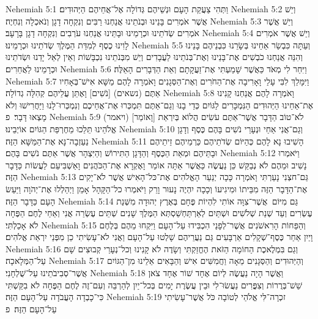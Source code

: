 Nehemiah 5:1	וַתְּהִי צַעֲקַת הָעָם וּנְשֵׁיהֶם גְּדוֹלָה אֶל־אֲחֵיהֶם הַיְּהוּדִים׃
Nehemiah 5:2	וְיֵשׁ אֲשֶׁר אֹמְרִים בָּנֵינוּ וּבְנֹתֵינוּ אֲנַחְנוּ רַבִּים וְנִקְחָה דָגָן וְנֹאכְלָה וְנִחְיֶה׃
Nehemiah 5:3	וְיֵשׁ אֲשֶׁר אֹמְרִים שְׂדֹתֵינוּ וּכְרָמֵינוּ וּבָתֵּינוּ אֲנַחְנוּ עֹרְבִים וְנִקְחָה דָגָן בָּרָעָב׃
Nehemiah 5:4	וְיֵשׁ אֲשֶׁר אֹמְרִים לָוִינוּ כֶסֶף לְמִדַּת הַמֶּלֶךְ שְׂדֹתֵינוּ וּכְרָמֵינוּ׃
Nehemiah 5:5	וְעַתָּה כִּבְשַׂר אַחֵינוּ בְּשָׂרֵנוּ כִּבְנֵיהֶם בָּנֵינוּ וְהִנֵּה אֲנַחְנוּ כֹבְשִׁים אֶת־בָּנֵינוּ וְאֶת־בְּנֹתֵינוּ לַעֲבָדִים וְיֵשׁ מִבְּנֹתֵינוּ נִכְבָּשׁוֹת וְאֵין לְאֵל יָדֵנוּ וּשְׂדֹתֵינוּ וּכְרָמֵינוּ לַאֲחֵרִים׃
Nehemiah 5:6	וַיִּחַר לִי מְאֹד כַּאֲשֶׁר שָׁמַעְתִּי אֶת־זַעֲקָתָם וְאֵת הַדְּבָרִים הָאֵלֶּה׃
Nehemiah 5:7	וַיִּמָּלֵךְ לִבִּי עָלַי וָאָרִיבָה אֶת־הַחֹרִים וְאֶת־הַסְּגָנִים וָאֹמְרָה לָהֶם מַשָּׁא אִישׁ־בְּאָחִיו אַתֶּם (נשאים) [נֹשִׁים] וָאֶתֵּן עֲלֵיהֶם קְהִלָּה גְדוֹלָה׃
Nehemiah 5:8	וָאֹמְרָה לָהֶם אֲנַחְנוּ קָנִינוּ אֶת־אַחֵינוּ הַיְּהוּדִים הַנִּמְכָּרִים לַגּוֹיִם כְּדֵי בָנוּ וְגַם־אַתֶּם תִּמְכְּרוּ אֶת־אֲחֵיכֶם וְנִמְכְּרוּ־לָנוּ וַיַּחֲרִישׁוּ וְלֹא מָצְאוּ דָּבָר׃ {פ}
Nehemiah 5:9	(ויאמר) [וָאוֹמַר] לֹא־טוֹב הַדָּבָר אֲשֶׁר־אַתֶּם עֹשִׂים הֲלוֹא בְּיִרְאַת אֱלֹהֵינוּ תֵּלֵכוּ מֵחֶרְפַּת הַגּוֹיִם אוֹיְבֵינוּ׃
Nehemiah 5:10	וְגַם־אֲנִי אַחַי וּנְעָרַי נֹשִׁים בָּהֶם כֶּסֶף וְדָגָן נַעַזְבָה־נָּא אֶת־הַמַּשָּׁא הַזֶּה׃
Nehemiah 5:11	הָשִׁיבוּ נָא לָהֶם כְּהַיּוֹם שְׂדֹתֵיהֶם כַּרְמֵיהֶם זֵיתֵיהֶם וּבָתֵּיהֶם וּמְאַת הַכֶּסֶף וְהַדָּגָן הַתִּירוֹשׁ וְהַיִּצְהָר אֲשֶׁר אַתֶּם נֹשִׁים בָּהֶם׃
Nehemiah 5:12	וַיֹּאמְרוּ נָשִׁיב וּמֵהֶם לֹא נְבַקֵּשׁ כֵּן נַעֲשֶׂה כַּאֲשֶׁר אַתָּה אוֹמֵר וָאֶקְרָא אֶת־הַכֹּהֲנִים וָאַשְׁבִּיעֵם לַעֲשׂוֹת כַּדָּבָר הַזֶּה׃
Nehemiah 5:13	גַּם־חצְנִי נָעַרְתִּי וָאֹמְרָה כָּכָה יְנַעֵר הָאֱלֹהִים אֶת־כּל־הָאִישׁ אֲשֶׁר לֹא־יָקִים אֶת־הַדָּבָר הַזֶּה מִבֵּיתוֹ וּמִיגִיעוֹ וְכָכָה יִהְיֶה נָעוּר וָרֵק וַיֹּאמְרוּ כל־הַקָּהָל אָמֵן וַיְהַלְלוּ אֶת־יְהֹוָה וַיַּעַשׂ הָעָם כַּדָּבָר הַזֶּה׃
Nehemiah 5:14	גַּם מִיּוֹם  אֲשֶׁר־צִוָּה אוֹתִי לִהְיוֹת פֶּחָם בְּאֶרֶץ יְהוּדָה מִשְּׁנַת עֶשְׂרִים וְעַד שְׁנַת שְׁלֹשִׁים וּשְׁתַּיִם לְאַרְתַּחְשַׁסְתְּא הַמֶּלֶךְ שָׁנִים שְׁתֵּים עֶשְׂרֵה אֲנִי וְאַחַי לֶחֶם הַפֶּחָה לֹא אָכַלְתִּי׃
Nehemiah 5:15	וְהַפַּחוֹת הָרִאשֹׁנִים אֲשֶׁר־לְפָנַי הִכְבִּידוּ עַל־הָעָם וַיִּקְחוּ מֵהֶם בְּלֶחֶם וָיַיִן אַחַר כֶּסֶף־שְׁקָלִים אַרְבָּעִים גַּם נַעֲרֵיהֶם שָׁלְטוּ עַל־הָעָם וַאֲנִי לֹא־עָשִׂיתִי כֵן מִפְּנֵי יִרְאַת אֱלֹהִים׃
Nehemiah 5:16	וְגַם בִּמְלֶאכֶת הַחוֹמָה הַזֹּאת הֶחֱזַקְתִּי וְשָׂדֶה לֹא קָנִינוּ וְכל־נְעָרַי קְבוּצִים שָׁם עַל־הַמְּלָאכָה׃
Nehemiah 5:17	וְהַיְּהוּדִים וְהַסְּגָנִים מֵאָה וַחֲמִשִּׁים אִישׁ וְהַבָּאִים אֵלֵינוּ מִן־הַגּוֹיִם אֲשֶׁר־סְבִיבֹתֵינוּ עַל־שֻׁלְחָנִי׃
Nehemiah 5:18	וַאֲשֶׁר הָיָה נַעֲשֶׂה לְיוֹם אֶחָד שׁוֹר אֶחָד צֹאן שֵׁשׁ־בְּרֻרוֹת וְצִפֳּרִים נַעֲשׂוּ־לִי וּבֵין עֲשֶׂרֶת יָמִים בְּכל־יַיִן לְהַרְבֵּה וְעִם־זֶה לֶחֶם הַפֶּחָה לֹא בִקַּשְׁתִּי כִּי־כָבְדָה הָעֲבֹדָה עַל־הָעָם הַזֶּה׃
Nehemiah 5:19	זכְרָה־לִּי אֱלֹהַי לְטוֹבָה כֹּל אֲשֶׁר־עָשִׂיתִי עַל־הָעָם הַזֶּה׃ {פ}
